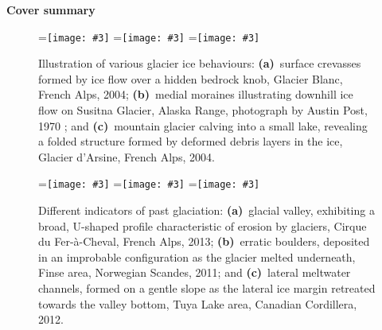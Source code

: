 \documentclass[a4paper]{kappa}
\newcommand{\subgraphics}[3][,]{%
  \setbox1=\hbox{\texttt{[image: \#3]}}%
  \leavevmode\rlap{\usebox1}%
  \rlap{\hspace*{0.25em}
        \raisebox{\dimexpr\ht1-3ex}{\textbf{(#2)}}}%
  \phantom{\usebox1}%
}
\begin{document}
\onecolumn

\hfill \textbf{\huge Cover summary}
\vfill
\tableofcontents

\newpage

\begin{figure}[b]
  \subgraphics{a}{photo-glacier-crevasses}%
  \hspace{1cm}%
  \subgraphics{b}{photo-glacier-susitna}%
  \hspace{1cm}%
  \subgraphics{c}{photo-glacier-fold}%
  \caption{Illustration of various glacier ice behaviours:
           \textbf{(a)}~surface crevasses formed by ice flow over a hidden
           bedrock knob, Glacier Blanc, French Alps, 2004;
           \textbf{(b)}~medial moraines illustrating downhill ice flow on
           Susitna Glacier, Alaska Range, photograph by Austin Post, 1970
           \citep{NSIDC.2009}; and
           \textbf{(c)}~mountain glacier calving into a small lake, revealing a
           folded structure formed by deformed debris layers in the ice,
           Glacier d'Arsine, French Alps, 2004.}
  \label{fig:glacier-mechanics}
\end{figure}

\begin{figure}[b]
  \subgraphics{a}{photo-glacial-valley}%
  \hspace{1cm}%
  \subgraphics{b}{photo-erratic-boulder}%
  \hspace{1cm}%
  \subgraphics{c}{photo-melt-channels}%
  \caption{Different indicators of past glaciation:
           \textbf{(a)}~glacial valley, exhibiting a broad, U-shaped profile
           characteristic of erosion by glaciers,
           Cirque du Fer-\`{a}-Cheval, French Alps, 2013;
           \textbf{(b)}~erratic boulders, deposited in an improbable
           configuration as the glacier melted underneath,
           Finse area, Norwegian Scandes, 2011; and
           \textbf{(c)}~lateral meltwater channels, formed on a gentle slope
           as the lateral ice margin retreated towards the valley bottom, Tuya
           Lake area, Canadian Cordillera, 2012.}
  \label{fig:glaciation-indicators}
\end{figure}
\end{document}
